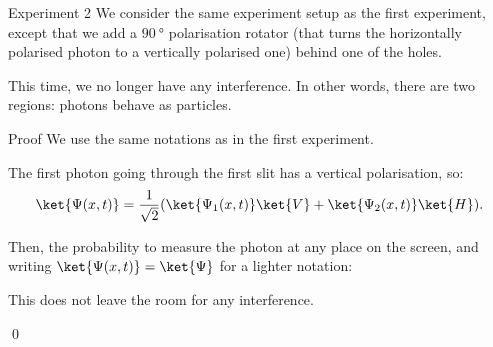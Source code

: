 \documentclass[a4paper]{article}
\begin{document}
\begin{parag}{Experiment 2}
    We consider the same experiment setup as the first experiment, except that we add a $\SI{90}{\degree}$ polarisation rotator (that turns the horizontally polarised photon to a vertically polarised one) behind one of the holes.
    
    This time, we no longer have any interference. In other words, there are two regions: photons behave as particles.


    \begin{subparag}{Proof}
        We use the same notations as in the first experiment. 

        The first photon going through the first slit has a vertical polarisation, so: 
        \[\ket{\Psi\left(x, t\right)} = \frac{1}{\sqrt{2}}\left(\ket{\Psi_1\left(x, t\right)} \ket{V} + \ket{\Psi_2\left(x, t\right)} \ket{H}\right).\]

        Then, the probability to measure the photon at any place on the screen, and writing $\ket{\Psi\left(x, t\right)} = \ket{\Psi}$ for a lighter notation: 

        This does not leave the room for any interference.

        \qed
    \end{subparag}
\end{parag}
\end{document}
